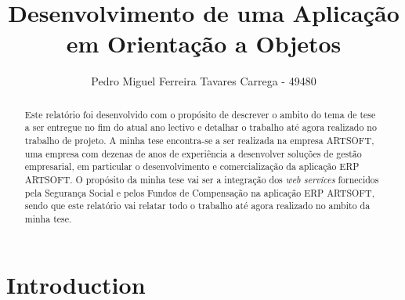 \documentclass[sigplan]{acmart}
\begin{document}
\title{Desenvolvimento de uma Aplicação em Orientação a Objetos}


\author{Pedro Miguel Ferreira Tavares Carrega - 49480}


\renewcommand{\shortauthors}{Pedro Miguel Ferreira Tavares Carrega - 49480}

\begin{abstract}
Este relatório foi desenvolvido com o propósito de descrever o ambito do tema de tese a ser entregue no fim do atual ano lectivo e detalhar o trabalho até agora realizado no trabalho de projeto. A minha tese encontra-se a ser realizada na empresa ARTSOFT, uma empresa com dezenas de anos de experiência a desenvolver soluções de gestão empresarial, em particular o desenvolvimento e comercialização da aplicação ERP ARTSOFT. O propósito da minha tese vai ser a integração dos \textit{web services} fornecidos pela Segurança Social e pelos Fundos de Compensação na aplicação ERP ARTSOFT, sendo que este relatório vai relatar todo o trabalho até agora realizado no ambito da minha tese.
\end{abstract}




\maketitle

\section{Introduction}
\end{document}
